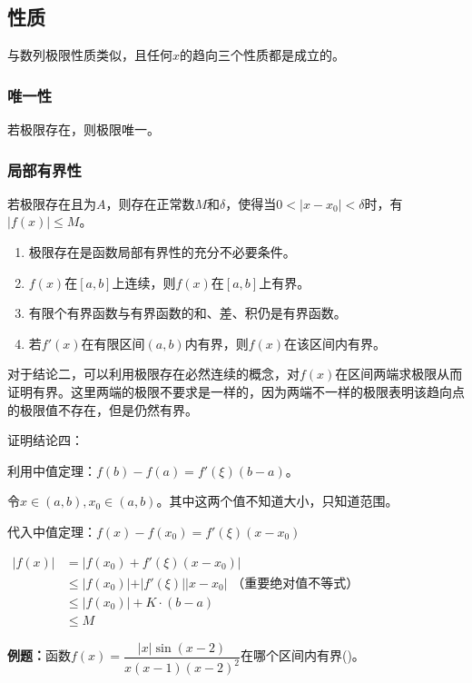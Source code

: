 \documentclass[UTF8, 12pt]{ctexart}
\begin{document}
\subsection{性质}

与数列极限性质类似，且任何$x$的趋向三个性质都是成立的。

\subsubsection{唯一性}

若极限存在，则极限唯一。

\subsubsection{局部有界性}

若极限存在且为$A$，则存在正常数$M$和$\delta$，使得当$0<\vert x-x_0\vert<\delta$时，有$\vert f(x)\vert\leqslant M$。

\begin{enumerate}
    \item 极限存在是函数局部有界性的充分不必要条件。
    \item $f(x)$在$[a,b]$上连续，则$f(x)$在$[a,b]$上有界。
    \item 有限个有界函数与有界函数的和、差、积仍是有界函数。
    \item 若$f'(x)$在有限区间$(a,b)$内有界，则$f(x)$在该区间内有界。
\end{enumerate}

对于结论二，可以利用极限存在必然连续的概念，对$f(x)$在区间两端求极限从而证明有界。这里两端的极限不要求是一样的，因为两端不一样的极限表明该趋向点的极限值不存在，但是仍然有界。

证明结论四：

利用中值定理：$f(b)-f(a)=f'(\xi)(b-a)$。

令$x\in(a,b),x_0\in(a,b)$。其中这两个值不知道大小，只知道范围。

代入中值定理：$f(x)-f(x_0)=f'(\xi)(x-x_0)$

$
\begin{aligned}
    \vert f(x)\vert & =\vert f(x_0)+f'(\xi)(x-x_0)\vert \\
    & \leqslant\vert f(x_0)\vert+\vert f'(\xi)\vert\vert x-x_0\vert\text{ （重要绝对值不等式）} \\
    & \leqslant\vert f(x_0)\vert+K\cdot(b-a) \\
    & \leqslant M
\end{aligned}
$

\textbf{例题：}函数$f(x)=\dfrac{\vert x\vert\sin(x-2)}{x(x-1)(x-2)^2}$在哪个区间内有界()。\medskip
\end{document}
